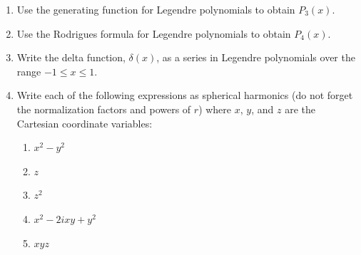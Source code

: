 \documentclass[fleqn]{article}
\begin{document}
\begin{enumerate}
\begin{enumerate}
      \end{enumerate}
    
    \item Use the generating function for Legendre polynomials to obtain $P_{3}\left(x\right)$.
    
    \item Use the Rodrigues formula for Legendre polynomials to obtain $P_{4}\left(x\right)$.
    
    
    \item Write the delta function, $\delta \left( x\right)$, as a series in Legendre polynomials over the range \newline $-1\leq x\leq 1$.
    
    
    \item Write each of the following expressions as spherical harmonics (do not forget the normalization factors and powers of $r$) where $x$, $y$, and $z$ are the Cartesian coordinate variables:
    
      \begin{enumerate}
      
        \item $x^{2}-y^{2}$
        
        \item $z$
        
        \item $z^{2}$
        
        \item $x^{2}-2ixy+y^{2}$
        
        \item $xyz$
      \end{enumerate}
    
  \end{enumerate}

  \pagebreak
\end{document}
